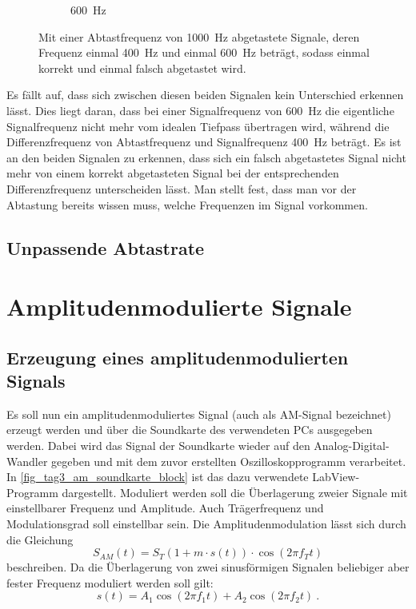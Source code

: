 \documentclass[
a4paper,
12pt,
pagesize,
ngerman
]{scrartcl}
\begin{document}
\begin{figure}[H]
\begin{subfigure}[t]{0.5\textwidth}
			\caption{\SI{600}{\hertz}}
		\end{subfigure}
		\label{fig_ali}
		\caption{Mit einer Abtastfrequenz von \SI{1000}{\hertz} abgetastete Signale, deren Frequenz einmal \SI{400}{\hertz} und einmal \SI{600}{\hertz} beträgt, sodass einmal korrekt und einmal falsch abgetastet wird.}
		\centering
	\end{figure}
	
	Es fällt auf, dass sich zwischen diesen beiden Signalen kein Unterschied erkennen lässt.
	Dies liegt daran, dass bei einer Signalfrequenz von \SI{600}{\hertz} die eigentliche Signalfrequenz nicht mehr vom idealen Tiefpass übertragen wird, während die Differenzfrequenz von Abtastfrequenz und Signalfrequenz \SI{400}{\hertz} beträgt.
	Es ist an den beiden Signalen zu erkennen, dass sich ein falsch abgetastetes Signal nicht mehr von einem korrekt abgetasteten Signal bei der entsprechenden Differenzfrequenz unterscheiden lässt.
	Man stellt fest, dass man vor der Abtastung bereits wissen muss, welche Frequenzen im Signal vorkommen. 
	
	\subsection{Unpassende Abtastrate}
	
	\section{Amplitudenmodulierte Signale}

	\subsection{Erzeugung eines amplitudenmodulierten Signals} \label{AMSignalErzeugung}
	
	Es soll nun ein amplitudenmoduliertes Signal (auch als AM-Signal bezeichnet) erzeugt werden und über die Soundkarte des verwendeten PCs ausgegeben werden.
	Dabei wird das Signal der Soundkarte wieder auf den Analog-Digital-Wandler gegeben und mit dem zuvor erstellten Oszilloskopprogramm verarbeitet.
	In \cref{fig_tag3_am_soundkarte_block} ist das dazu verwendete LabView-Programm dargestellt.
	Moduliert werden soll die Überlagerung zweier Signale mit einstellbarer Frequenz und Amplitude.
	Auch Trägerfrequenz und Modulationsgrad soll einstellbar sein.
	Die Amplitudenmodulation lässt sich durch die Gleichung
	\begin{equation} \label{AMFormel}
		S_{AM}(t)=S_T (1+m \cdot s(t)) \cdot \cos(2\pi f_T t)
	\end{equation}
	beschreiben.
	Da die Überlagerung von zwei sinusförmigen Signalen beliebiger aber fester Frequenz moduliert werden soll gilt:
	\begin{equation} \label{Ursprungssignal}
		s(t) = A_1 \cos (2\pi f_1 t) + A_2 \cos (2\pi f_2 t) \ . 
	\end{equation}
	
\end{document}
